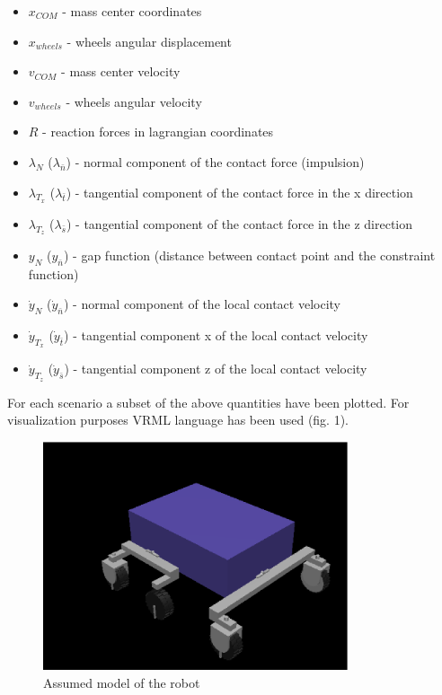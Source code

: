 \documentclass[a4paper]{article}
\begin{document}
\begin{itemize}
  \item $x_{COM}$ - mass center coordinates
  \item $x_{wheels}$ - wheels angular displacement 
  \item $v_{COM}$ - mass center velocity
  \item $v_{wheels}$ - wheels angular velocity
  \item $R$ - reaction forces in lagrangian coordinates
  \item $\lambda_{N}$ ($\lambda_{\bar{n}}$) - normal component of the contact force (impulsion)
  \item $\lambda_{T_x}$ ($\lambda_{\bar{t}}$) - tangential component of the contact force in the x direction
  \item $\lambda_{T_z}$ ($\lambda_{\bar{s}}$) - tangential component of the contact force in the z direction
  \item $y_{N}$ ($y_{\bar{n}}$) - gap function (distance between contact point and the constraint function)
  \item $\dot{y}_{N}$ ($\dot{y}_{\bar{n}}$) - normal component of the local contact velocity
  \item $\dot{y}_{T_x}$ ($\dot{y}_{\bar{t}}$) - tangential component x of the local contact velocity
  \item $\dot{y}_{T_z}$ ($\dot{y}_{\bar{s}}$) - tangential component z of the local contact velocity
\end{itemize}

\noindent For each scenario a subset of the above quantities have been plotted.
For visualization purposes VRML language has been used (fig. 1). \\

\begin{figure}[h!]
  \centering
    \includegraphics[width=0.8\textwidth]{rovereps}
  \caption{Assumed model of the robot}
\end{figure}
\end{document}
